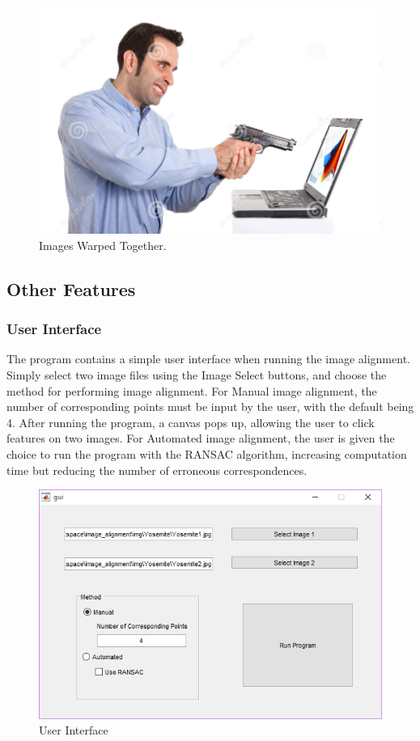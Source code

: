 \documentclass[12pt,journal,compsoc]{IEEEtran}
\begin{document}
\begin{figure}[h]
	\centering
		  \centering
		  \includegraphics[width=1\linewidth]{img/shoot3}
		  \caption{Images Warped Together.}
		  \label{fig:shoot3}
\end{figure}

\subsection{Other Features}

\subsubsection{User Interface}
The program contains a simple user interface when running the image alignment. Simply select two image files using the Image Select buttons, and choose the method for performing image alignment. For Manual image alignment, the number of corresponding points must be input by the user, with the default being 4. After running the program, a canvas pops up, allowing the user to click features on two images. For Automated image alignment, the user is given the choice to run the program with the RANSAC algorithm, increasing computation time but reducing the number of erroneous correspondences.

\begin{figure}[h]
	\centering
		  \centering
		  \includegraphics[width=1\linewidth]{img/gui1}
		  \caption{User Interface}
		  \label{fig:gui1}
\end{figure}
\end{document}
